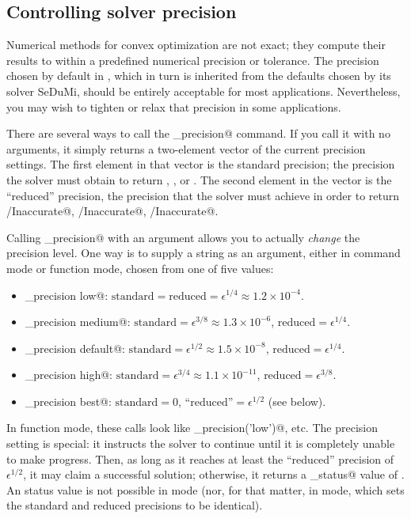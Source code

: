 \documentclass[12pt]{article}
\begin{document}
\subsection{Controlling solver precision}
\label{sec:precision}

Numerical methods for convex optimization are not exact; they compute their results
to within a predefined numerical precision or tolerance. The precision chosen by default in \cvx,
which in turn is inherited from the defaults chosen by its solver SeDuMi, should
be entirely acceptable for most applications. Nevertheless, you may wish to tighten
or relax that precision in some applications.

There are several ways to call the \verb@cvx_precision@ command. If you call it with no arguments,
it simply returns a two-element vector of the current precision settings. The first element
in that vector is the standard precision; the precision the solver must obtain to return
\verb@Solved@, \verb@Unbounded@, or \verb@Infeasible@. The second element in the vector is
the ``reduced'' precision, the precision that the solver must achieve in order to
return \verb@Solved/Inaccurate@, \verb@Unbounded/Inaccurate@, \verb@Infeasible/Inaccurate@.

Calling \verb@cvx_precision@ with an argument allows you to actually \emph{change} the
precision level. One way is to supply a string as an argument, either in command mode
or function mode, chosen from one of five values:
\begin{itemize}
	\item \verb@cvx_precision low@:      $\text{standard} = \text{reduced} = \epsilon^{1/4} \approx 1.2\times10^{-4}$.
	\item \verb@cvx_precision medium@:   $\text{standard} = \epsilon^{3/8} \approx 1.3\times10^{-6}$, $\text{reduced} = \epsilon^{1/4}$.
	\item \verb@cvx_precision default@:  $\text{standard} = \epsilon^{1/2} \approx 1.5\times10^{-8}$, $\text{reduced} = \epsilon^{1/4}$.
	\item \verb@cvx_precision high@:     $\text{standard} = \epsilon^{3/4} \approx 1.1\times10^{-11}$, $\text{reduced} = \epsilon^{3/8}$.
	\item \verb@cvx_precision best@:     $\text{standard} = 0$, $\text{``reduced''} = \epsilon^{1/2}$  (see below).
\end{itemize}
In function mode, these calls look like \verb@cvx_precision('low')@, etc.
The \verb@best@ precision setting is special: it instructs the solver to continue until it is
completely unable to make progress. Then, as long as it reaches at least the ``reduced'' precision
of $\epsilon^{1/2}$, it may claim a successful solution; otherwise,
it returns a \verb@cvx_status@ value of \verb@Failed@. An \verb@Inaccurate@ status value is 
not possible in \verb@best@ mode (nor, for that matter, in \verb@low@ mode, which
sets the standard and reduced precisions to be identical).
\end{document}
